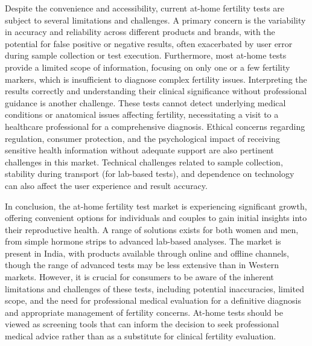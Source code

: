 \documentclass{article}
\begin{document}
Despite the convenience and accessibility, current at-home fertility tests are subject to several limitations and challenges. A primary concern is the variability in accuracy and reliability across different products and brands, with the potential for false positive or negative results, often exacerbated by user error during sample collection or test execution. Furthermore, most at-home tests provide a limited scope of information, focusing on only one or a few fertility markers, which is insufficient to diagnose complex fertility issues. Interpreting the results correctly and understanding their clinical significance without professional guidance is another challenge. These tests cannot detect underlying medical conditions or anatomical issues affecting fertility, necessitating a visit to a healthcare professional for a comprehensive diagnosis. Ethical concerns regarding regulation, consumer protection, and the psychological impact of receiving sensitive health information without adequate support are also pertinent challenges in this market. Technical challenges related to sample collection, stability during transport (for lab-based tests), and dependence on technology can also affect the user experience and result accuracy.

In conclusion, the at-home fertility test market is experiencing significant growth, offering convenient options for individuals and couples to gain initial insights into their reproductive health. A range of solutions exists for both women and men, from simple hormone strips to advanced lab-based analyses. The market is present in India, with products available through online and offline channels, though the range of advanced tests may be less extensive than in Western markets. However, it is crucial for consumers to be aware of the inherent limitations and challenges of these tests, including potential inaccuracies, limited scope, and the need for professional medical evaluation for a definitive diagnosis and appropriate management of fertility concerns. At-home tests should be viewed as screening tools that can inform the decision to seek professional medical advice rather than as a substitute for clinical fertility evaluation.
\end{document}
